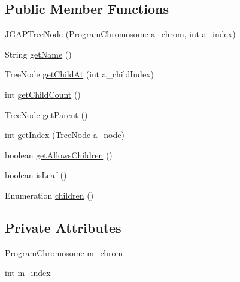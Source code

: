 \subsection*{Public Member Functions}
\begin{DoxyCompactItemize}
\item 
\hyperlink{classorg_1_1jgap_1_1gp_1_1impl_1_1_j_g_a_p_tree_node_abcec6a049e466d9e8d381ad6bdb01be5}{J\-G\-A\-P\-Tree\-Node} (\hyperlink{classorg_1_1jgap_1_1gp_1_1impl_1_1_program_chromosome}{Program\-Chromosome} a\-\_\-chrom, int a\-\_\-index)
\item 
String \hyperlink{classorg_1_1jgap_1_1gp_1_1impl_1_1_j_g_a_p_tree_node_af788bd7de8abd8a8dd86761824623b5e}{get\-Name} ()
\item 
Tree\-Node \hyperlink{classorg_1_1jgap_1_1gp_1_1impl_1_1_j_g_a_p_tree_node_abe0e8c026e6b85c9129ea36ee6ab740f}{get\-Child\-At} (int a\-\_\-child\-Index)
\item 
int \hyperlink{classorg_1_1jgap_1_1gp_1_1impl_1_1_j_g_a_p_tree_node_a3ce4eaa9ae4b8c3f95b24a5b62e52d62}{get\-Child\-Count} ()
\item 
Tree\-Node \hyperlink{classorg_1_1jgap_1_1gp_1_1impl_1_1_j_g_a_p_tree_node_a65779bb924d0f01fbbbe05898c40b8b4}{get\-Parent} ()
\item 
int \hyperlink{classorg_1_1jgap_1_1gp_1_1impl_1_1_j_g_a_p_tree_node_aa73dbd0edc2fdceaefd594ced7953fb3}{get\-Index} (Tree\-Node a\-\_\-node)
\item 
boolean \hyperlink{classorg_1_1jgap_1_1gp_1_1impl_1_1_j_g_a_p_tree_node_a34f92de9e68fcbff993094d607b891ee}{get\-Allows\-Children} ()
\item 
boolean \hyperlink{classorg_1_1jgap_1_1gp_1_1impl_1_1_j_g_a_p_tree_node_afccf375056fec12f6bb80d9b6451eeea}{is\-Leaf} ()
\item 
Enumeration \hyperlink{classorg_1_1jgap_1_1gp_1_1impl_1_1_j_g_a_p_tree_node_accc648cf2ff9d1f533e92e711dca777b}{children} ()
\end{DoxyCompactItemize}
\subsection*{Private Attributes}
\begin{DoxyCompactItemize}
\item 
\hyperlink{classorg_1_1jgap_1_1gp_1_1impl_1_1_program_chromosome}{Program\-Chromosome} \hyperlink{classorg_1_1jgap_1_1gp_1_1impl_1_1_j_g_a_p_tree_node_ac053f002a5d10b9a0db8a44b5f6f8fb2}{m\-\_\-chrom}
\item 
int \hyperlink{classorg_1_1jgap_1_1gp_1_1impl_1_1_j_g_a_p_tree_node_a2fea7816f54f4a14a8ed20e20d7083d8}{m\-\_\-index}
\end{DoxyCompactItemize}
